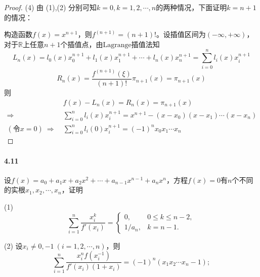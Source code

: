 \documentclass[12pt, a4paper, oneside]{ctexart}
\begin{document}
\begin{proof}
    (4) 由 (1),(2) 分别可知$k=0, k=1,2,\cdots, n$的两种情况，下面证明$k=n+1$的情况：

    构造函数$f(x)=  x^{n+1}$，则$f^{(n+1)}=(n+1)!$。设插值区间为$(-\infty, +\infty)$，对于$\mathbb{R}$上任意$n+1$个插值点，由$\text{Lagrange插值法}$知
    \begin{equation*}
        L_n(x) = l_0(x)x_0^{n+1}+l_1(x)x_1^{n+1}+\cdots+l_n(x)x_n^{n+1}=\sum_{i=0}^nl_i(x)x_i^{n+1}
    \end{equation*}
    \begin{equation*}
        R_n(x)=\frac{f^{(n+1)}(\xi)}{(n+1)!}\pi_{n+1}(x) = \pi_{n+1}(x)
    \end{equation*}
    则
    \begin{equation*}
        \begin{aligned}
            &\ f(x)-L_n(x) = R_n(x) = \pi_{n+1}(x)\\
            \Rightarrow &\ \sum_{i=0}^nl_i(x)x_i^{n+1} = x^{n+1}-(x-x_0)(x-x_1)\cdots(x-x_n)\\
            (\text{令}x = 0)\ \Rightarrow&\ \sum_{i=0}^nl_i(0)x_i^{n+1} = (-1)^nx_0x_1\cdots x_n
        \end{aligned}
    \end{equation*}
\end{proof}
\paragraph{4.11}设$f(x) = a_0+a_1x+a_2x^2+\cdots+a_{n-1}x^{n-1}+a_nx^n$，方程$f(x)=0$有$n$个不同的实根$x_1,x_2,\cdots,x_n$，证明

(1)\begin{equation*}
    \sum_{i=1}^n\frac{x_i^k}{f'(x_i)}=\begin{cases}
        0,&0\leqslant k\leqslant n-2,\\
        1/a_n,&k=n-1.
    \end{cases}
\end{equation*}

(2) 设$x_i\neq 0,-1\ (i=1,2,\cdots, n)$，则
\begin{equation*}
    \sum_{i=1}^n\frac{x_i^nf(x_i^{-1})}{f'(x_i)(1+x_i)}=(-1)^n(x_1x_2\cdots x_n-1);
\end{equation*}
\end{document}
